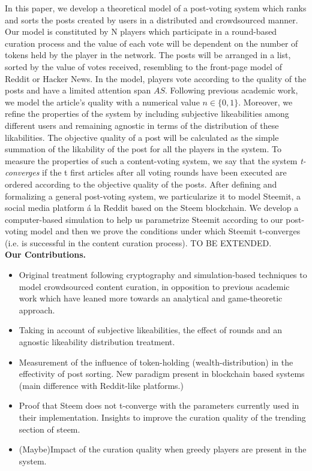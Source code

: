   
  In this paper, we develop a theoretical model of a post-voting system which ranks and sorts the posts created by users in a distributed and crowdsourced manner. Our model is constituted by N players which participate in a round-based curation process and the value of each vote will be dependent on the number of tokens held by the player in the network. The posts will be arranged in a list, sorted by the value of votes received, resembling to the front-page model of Reddit or Hacker News. In the model, players vote according to the quality of the posts and have a limited attention span $AS$. Following previous academic work, we model the article's quality with a numerical value $n \in \lbrace 0,1 \rbrace$. Moreover, we refine the properties of the system by including subjective likeabilities among different users and remaining agnostic in terms of the distribution of these likabilities. The objective quality of a post will be calculated as the simple summation of the likability of the post for all the players in the system. To measure the properties of such a content-voting system, we say that the system \textit{t-converges} if the t first articles after all voting rounds have been executed are ordered according to the objective quality of the posts.
  After defining and formalizing a general post-voting system, we particularize it to model Steemit, a social media platform á la Reddit based on the Steem blockchain. We develop a computer-based simulation to help us parametrize Steemit according to our post-voting model and then we prove the conditions under which Steemit t-converges (i.e. is successful in the content curation process). TO BE EXTENDED.\\
  
  \textbf{Our Contributions.}  
  
  \begin{itemize}
  
  \item Original treatment following cryptography and simulation-based techniques to model crowdsourced content curation, in opposition to previous academic work which have leaned more towards an analytical and game-theoretic approach.
  
  \item Taking in account of subjective likeabilities, the effect of rounds and an agnostic likeability distribution treatment.
  
  \item Measurement of the influence of token-holding (wealth-distribution) in the effectivity of post sorting. New paradigm present in blockchain based systems (main difference with Reddit-like platforms.)
   
  \item Proof that Steem does not t-converge with the parameters currently used in their implementation. Insights to improve the curation quality of the trending section of steem.
   
  \item (Maybe)Impact of the curation quality when greedy players are present in the system.
   
  \end{itemize}
    

  
  
  